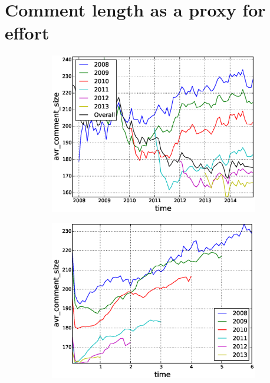 \section{Comment length as a proxy for effort}

\begin{figure}[!tb]
\centering
\begin{subfigure}{.49\textwidth}\includegraphics[scale=0.4]{./images/avr_comment_size_over_time_cohorts.eps}\caption{}\end{subfigure}
\begin{subfigure}{.49\textwidth}\includegraphics[scale=0.4]{./images/avr_comment_size_cohorts.eps}\caption{}\end{subfigure}

\end{figure}

